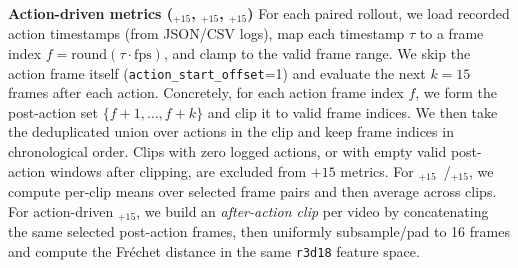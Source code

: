 \noindent\textbf{Action-driven metrics (\SSIM$_{+15}$, \LPIPS$_{+15}$, \FVD$_{+15}$)}
For each paired rollout, we load recorded action timestamps (from JSON/CSV logs), map each timestamp $\tau$ to a frame index $f=\mathrm{round}(\tau \cdot \mathrm{fps})$, and clamp to the valid frame range.
We skip the action frame itself (\texttt{action\_start\_offset}=1) and evaluate the next $k{=}15$ frames after each action.
Concretely, for each action frame index $f$, we form the post-action set $\{f+1,\dots,f+k\}$ and clip it to valid frame indices.
We then take the deduplicated union over actions in the clip and keep frame indices in chronological order.
Clips with zero logged actions, or with empty valid post-action windows after clipping, are excluded from $+15$ metrics.
For \SSIM$_{+15}$~/\LPIPS$_{+15}$, we compute per-clip means over selected frame pairs and then average across clips.
For action-driven \FVD$_{+15}$, we build an \emph{after-action clip} per video by concatenating the same selected post-action frames, then uniformly subsample/pad to 16 frames and compute the Fr\'echet distance in the same \texttt{r3d18} feature space.
